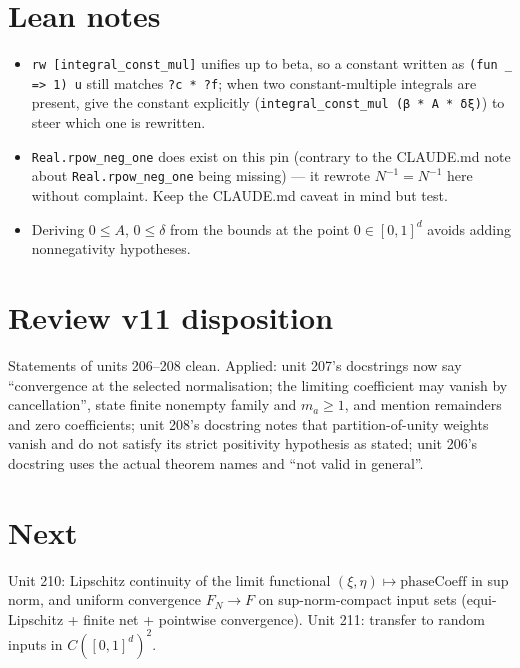 \documentclass[11pt]{article}
\begin{document}
\section{Lean notes}
\begin{itemize}
\item \texttt{rw [integral\_const\_mul]} unifies up to beta, so a constant written as
  \texttt{(fun \_ => 1) u} still matches \texttt{?c * ?f}; when two constant-multiple integrals are
  present, give the constant explicitly (\texttt{integral\_const\_mul (β * A * δξ)}) to steer which
  one is rewritten.
\item \texttt{Real.rpow\_neg\_one} does exist on this pin (contrary to the CLAUDE.md note about
  \texttt{Real.rpow\_neg\_one} being missing) --- it rewrote $N^{-1}=N^{-1}$ here without complaint.
  Keep the CLAUDE.md caveat in mind but test.
\item Deriving $0\le A$, $0\le\delta$ from the bounds at the point $0\in[0,1]^d$ avoids adding
  nonnegativity hypotheses.
\end{itemize}

\section{Review v11 disposition}
Statements of units 206--208 clean. Applied: unit 207's docstrings now say ``convergence at the
selected normalisation; the limiting coefficient may vanish by cancellation'', state finite nonempty
family and $m_a\ge1$, and mention remainders and zero coefficients; unit 208's docstring notes that
partition-of-unity weights vanish and do not satisfy its strict positivity hypothesis as stated;
unit 206's docstring uses the actual theorem names and ``not valid in general''.

\section{Next}
Unit 210: Lipschitz continuity of the limit functional $(\xi,\eta)\mapsto\mathrm{phaseCoeff}$ in sup
norm, and uniform convergence $F_N\to F$ on sup-norm-compact input sets (equi-Lipschitz + finite net
+ pointwise convergence). Unit 211: transfer to random inputs in $C([0,1]^d)^2$.
\end{document}
